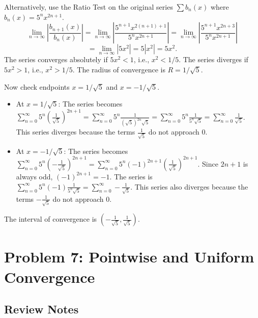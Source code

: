 \documentclass{article}
\begin{document}
\begin{enumerate}
    Alternatively, use the Ratio Test on the original series \(\sum b_n(x)\) where \(b_n(x) = 5^n x^{2n+1}\).
    \[ \lim_{n\to\infty} \left| \frac{b_{n+1}(x)}{b_n(x)} \right| = \lim_{n\to\infty} \left| \frac{5^{n+1} x^{2(n+1)+1}}{5^n x^{2n+1}} \right| = \lim_{n\to\infty} \left| \frac{5^{n+1} x^{2n+3}}{5^n x^{2n+1}} \right| \]
    \[ = \lim_{n\to\infty} \left| 5 x^2 \right| = 5 |x^2| = 5 x^2. \]
    The series converges absolutely if \(5 x^2 < 1\), i.e., \(x^2 < 1/5\).
    The series diverges if \(5 x^2 > 1\), i.e., \(x^2 > 1/5\).
    The radius of convergence is \(R = 1/\sqrt{5}\).

    Now check endpoints \(x = 1/\sqrt{5}\) and \(x = -1/\sqrt{5}\).
    \begin{itemize}
        \item At \(x = 1/\sqrt{5}\): The series becomes \(\sum_{n=0}^\infty 5^n \left(\frac{1}{\sqrt{5}}\right)^{2n+1} = \sum_{n=0}^\infty 5^n \frac{1}{(\sqrt{5})^{2n} \sqrt{5}} = \sum_{n=0}^\infty 5^n \frac{1}{5^n \sqrt{5}} = \sum_{n=0}^\infty \frac{1}{\sqrt{5}}\). This series diverges because the terms \(\frac{1}{\sqrt{5}}\) do not approach 0.
        \item At \(x = -1/\sqrt{5}\): The series becomes \(\sum_{n=0}^\infty 5^n \left(-\frac{1}{\sqrt{5}}\right)^{2n+1} = \sum_{n=0}^\infty 5^n (-1)^{2n+1} \left(\frac{1}{\sqrt{5}}\right)^{2n+1}\). Since \(2n+1\) is always odd, \((-1)^{2n+1} = -1\). The series is \(\sum_{n=0}^\infty 5^n (-1) \frac{1}{5^n \sqrt{5}} = \sum_{n=0}^\infty -\frac{1}{\sqrt{5}}\). This series also diverges because the terms \(-\frac{1}{\sqrt{5}}\) do not approach 0.
    \end{itemize}
    The interval of convergence is \((-\frac{1}{\sqrt{5}}, \frac{1}{\sqrt{5}})\).
\end{enumerate}

\section*{Problem 7: Pointwise and Uniform Convergence}

\subsection*{Review Notes}
\end{document}
